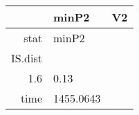 \begin{table}[ht]
\centering
\begingroup\tiny
\begin{tabular}{rll}
  \hline
 & minP2 & V2 \\ 
  \hline
stat & minP2 &  \\ 
  IS.dist &  &  \\ 
  1.6 & 0.13 &  \\ 
  time & 1455.0643 &  \\ 
   \hline
\end{tabular}
\endgroup
\end{table}
